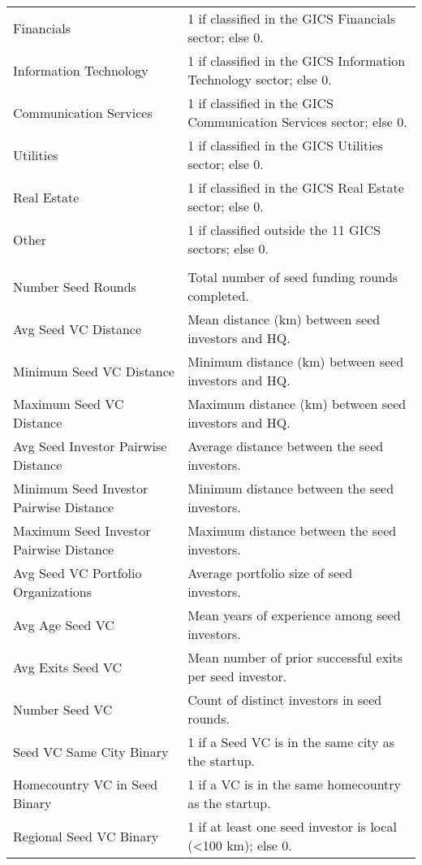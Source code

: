 {\begin{tabular}{p{} p{}}
Financials & 1 if classified in the GICS Financials sector; else 0. \\[0.4em]
Information Technology & 1 if classified in the GICS Information Technology sector; else 0. \\[0.4em]
Communication Services & 1 if classified in the GICS Communication Services sector; else 0. \\[0.4em]
Utilities & 1 if classified in the GICS Utilities sector; else 0. \\[0.4em]
Real Estate & 1 if classified in the GICS Real Estate sector; else 0. \\[0.4em]
Other & 1 if classified outside the 11 GICS sectors; else 0. \\[0.4em]
\addlinespace[0.5em]
\midrule
\multicolumn{2}{c}{\tiny\textsc{TREATMENT VARIABLES}} \\
\midrule
Number Seed Rounds & Total number of seed funding rounds completed. \\[0.4em]
Avg Seed VC Distance & Mean distance (km) between seed investors and HQ. \\[0.4em]
Minimum Seed VC Distance & Minimum distance (km) between seed investors and HQ. \\[0.4em]
Maximum Seed VC Distance & Maximum distance (km) between seed investors and HQ. \\[0.4em]
Avg Seed Investor Pairwise Distance & Average distance between the seed investors. \\[0.4em]
Minimum Seed Investor Pairwise Distance & Minimum distance between the seed investors. \\[0.4em]
Maximum Seed Investor Pairwise Distance & Maximum distance between the seed investors. \\[0.4em]
Avg Seed VC Portfolio Organizations & Average portfolio size of seed investors. \\[0.4em]
Avg Age Seed VC & Mean years of experience among seed investors. \\[0.4em]
Avg Exits Seed VC & Mean number of prior successful exits per seed investor. \\[0.4em]
Number Seed VC & Count of distinct investors in seed rounds. \\[0.4em]
Seed VC Same City Binary & 1 if a Seed VC is in the same city as the startup. \\[0.4em]
Homecountry VC in Seed Binary & 1 if a VC is in the same homecountry as the startup. \\[0.4em]
Regional Seed VC Binary & 1 if at least one seed investor is local (<100 km); else 0. \\[0.4em]

\end{tabular}}
